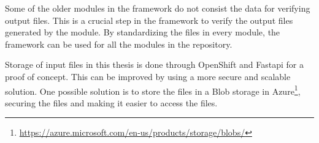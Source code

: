 Some of the older modules in the framework do not consist the data for verifying output files. This is a crucial step in the framework to verify the output 
files generated by the module. By standardizing the files in every module, the framework can be used for all the modules in the repository.

Storage of input files in this thesis is done through OpenShift and Fast\acrshort{api} for a proof of concept. This can be improved by using a more secure and 
scalable solution. One possible solution is to store the files in a Blob storage in Azure\footnote{\url{https://azure.microsoft.com/en-us/products/storage/blobs/}}, 
securing the files and making it easier to access the files.